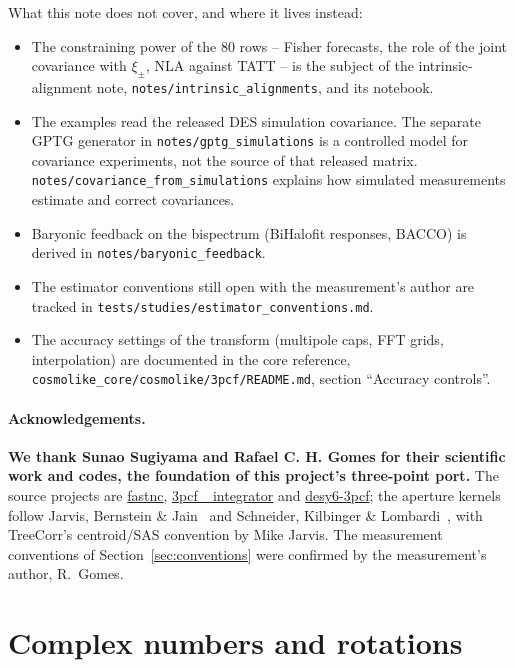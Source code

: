 \documentclass[11pt]{article}
\newcommand{\us}{\_\allowbreak}
\numberwithin{equation}{section}
\begin{document}
What this note does not cover, and where it lives instead:
\begin{itemize}
  \item The constraining power of the $80$ rows -- Fisher forecasts,
    the role of the joint covariance with $\xi_\pm$, NLA against
    TATT -- is the subject of the intrinsic-alignment note,
    \texttt{notes/intrinsic\us alignments}, and its notebook.
  \item The examples read the released DES simulation covariance. The
    separate GPTG generator in \texttt{notes/gptg\us simulations} is a
    controlled model for covariance experiments, not the source of that
    released matrix. \texttt{notes/covariance\us from\us simulations}
    explains how simulated measurements estimate and correct covariances.
  \item Baryonic feedback on the bispectrum (BiHalofit responses,
    BACCO) is derived in \texttt{notes/baryonic\us feedback}.
  \item The estimator conventions still open with the measurement's
    author are tracked in
    \texttt{tests/studies/estimator\us conventions.md}.
  \item The accuracy settings of the transform (multipole caps, FFT
    grids, interpolation) are documented in the core reference,
    \texttt{cosmolike\us core/cosmolike/3pcf/README.md}, section
    ``Accuracy controls''.
\end{itemize}

\paragraph{Acknowledgements.}
\textbf{We thank Sunao Sugiyama and Rafael C. H. Gomes for their
scientific work and codes, the foundation of this project's
three-point port.}  The source projects are
\href{https://github.com/git-sunao/fastnc}{fastnc},
\href{https://github.com/rchgomes/3pcf_integrator}{3pcf\us
integrator} and
\href{https://github.com/rchgomes/desy6-3pcf}{desy6-3pcf}; the
aperture kernels follow Jarvis, Bernstein \& Jain~\cite{JBJ} and
Schneider, Kilbinger \& Lombardi~\cite{SKL}, with TreeCorr's
centroid/SAS convention by Mike Jarvis.  The measurement
conventions of Section~\ref{sec:conventions} were confirmed by the
measurement's author, R.~Gomes.

\appendix

\section{Complex numbers and rotations}
\label{app:complex}
\end{document}
